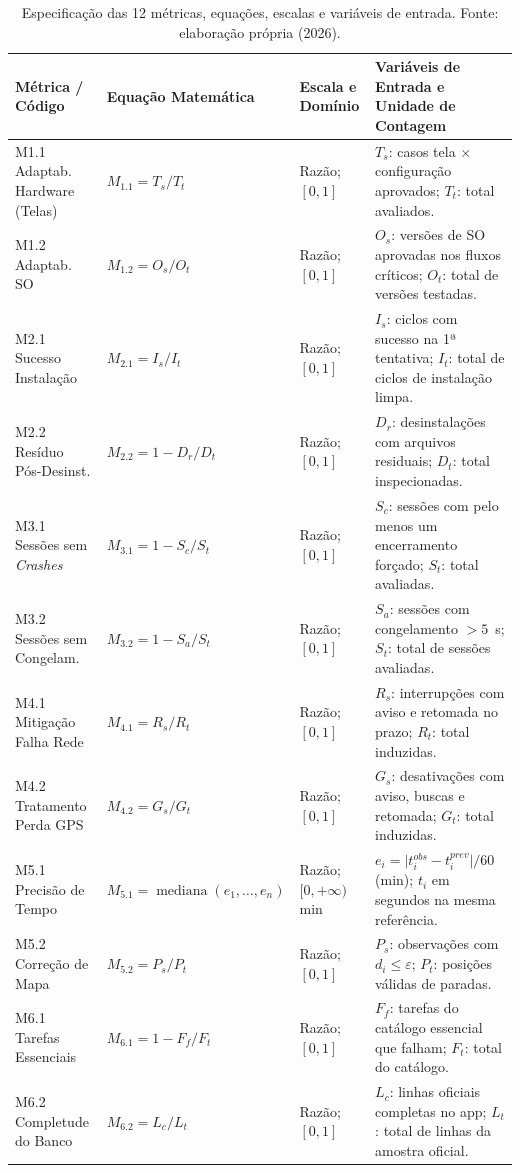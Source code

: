 \documentclass[11pt,a4paper]{article}
\begin{document}
\begin{table}[!htbp]
\centering
\caption{Especificação das 12 métricas, equações, escalas e variáveis de entrada. Fonte: elaboração própria (2026).}
\label{tab:metricas_definicao}
\scriptsize
\renewcommand{\arraystretch}{0.92}
\begin{tabularx}{\textwidth}{>{\raggedright\arraybackslash}p{2.6cm} >{\raggedright\arraybackslash}p{3.8cm} >{\raggedright\arraybackslash}p{2.1cm} X}
\toprule
\textbf{Métrica / Código} & \textbf{Equação Matemática} & \textbf{Escala e Domínio} & \textbf{Variáveis de Entrada e Unidade de Contagem} \\
\midrule
M1.1 Adaptab. Hardware (Telas) & $M_{1.1} = T_s / T_t$ & Razão; $[0, 1]$ & $T_s$: casos tela $\times$ configuração aprovados; $T_t$: total avaliados. \\
M1.2 Adaptab. SO & $M_{1.2} = O_s / O_t$ & Razão; $[0, 1]$ & $O_s$: versões de SO aprovadas nos fluxos críticos; $O_t$: total de versões testadas. \\
M2.1 Sucesso Instalação & $M_{2.1} = I_s / I_t$ & Razão; $[0, 1]$ & $I_s$: ciclos com sucesso na 1ª tentativa; $I_t$: total de ciclos de instalação limpa. \\
M2.2 Resíduo Pós-Desinst. & $M_{2.2} = 1 - D_r / D_t$ & Razão; $[0, 1]$ & $D_r$: desinstalações com arquivos residuais; $D_t$: total inspecionadas. \\
M3.1 Sessões sem \textit{Crashes} & $M_{3.1} = 1 - S_c / S_t$ & Razão; $[0, 1]$ & $S_c$: sessões com pelo menos um encerramento forçado; $S_t$: total avaliadas. \\
M3.2 Sessões sem Congelam. & $M_{3.2} = 1 - S_a / S_t$ & Razão; $[0, 1]$ & $S_a$: sessões com congelamento $> 5$~s; $S_t$: total de sessões avaliadas. \\
M4.1 Mitigação Falha Rede & $M_{4.1} = R_s / R_t$ & Razão; $[0, 1]$ & $R_s$: interrupções com aviso e retomada no prazo; $R_t$: total induzidas. \\
M4.2 Tratamento Perda GPS & $M_{4.2} = G_s / G_t$ & Razão; $[0, 1]$ & $G_s$: desativações com aviso, buscas e retomada; $G_t$: total induzidas. \\
M5.1 Precisão de Tempo & $M_{5.1} = \operatorname{mediana}(e_1, \ldots, e_n)$ & Razão; $[0, +\infty)$ min & $e_i = \lvert t^{obs}_i - t^{prev}_i \rvert / 60$ (min); $t_i$ em segundos na mesma referência. \\
M5.2 Correção de Mapa & $M_{5.2} = P_s / P_t$ & Razão; $[0, 1]$ & $P_s$: observações com $d_i \le \varepsilon$; $P_t$: posições válidas de paradas. \\
M6.1 Tarefas Essenciais & $M_{6.1} = 1 - F_f / F_t$ & Razão; $[0, 1]$ & $F_f$: tarefas do catálogo essencial que falham; $F_t$: total do catálogo. \\
M6.2 Completude do Banco & $M_{6.2} = L_c / L_t$ & Razão; $[0, 1]$ & $L_c$: linhas oficiais completas no app; $L_t$: total de linhas da amostra oficial. \\
\bottomrule
\end{tabularx}
\end{table}
\end{document}
